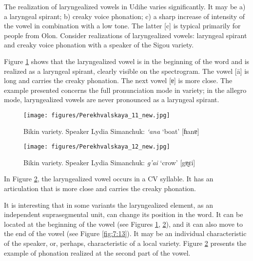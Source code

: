 \documentclass[output=paper,colorlinks,citecolor=brown]{langscibook}
\begin{document}
The realization of laryngealized vowels in  Udihe varies significantly. It may be a) a laryngeal spirant; b) creaky voice phonation; c) a sharp increase of intensity of the vowel in combination with a low tone. The latter [c] is typical primarily for people from Olon. Consider realizations of laryngealized vowels: laryngeal spirant and creaky voice phonation with a speaker of the Sigou variety.


Figure \ref{fig:7:11} shows that the laryngealized vowel is in the beginning of the word and is realized as a laryngeal spirant, clearly visible on the spectrogram. The vowel [ā] is long and carries the creaky phonation. The next vowel [{ɐ}] is more close. The example presented concerns the full pronunciation mode in  variety; in the allegro mode, laryngealized vowels are never pronounced as a laryngeal spirant.\largerpage


\begin{figure}
\texttt{[image: figures/Perekhvalskaya\_11\_new.jpg]}
\caption{Bikin variety. Speaker Lydia Simanchuk: \textit{‘ana} ‘boat’ [{ɦ}an{ɐ}]}
\label{fig:7:11}
\end{figure}

\begin{figure}
\texttt{[image: figures/Perekhvalskaya\_12\_new.jpg]}
\caption{Bikin variety. Speaker Lydia Simanchuk: \textit{g’ai} ‘crow’ [g{ɐ}{̰}{ɛ}i]}
\label{fig:7:12}
\end{figure}

In Figure \ref{fig:7:12}, the laryngealized vowel occurs in a CV syllable. It has an articulation that is more close and carries the creaky phonation.

It is interesting that in some  variants the laryngealized element, as an independent suprasegmental unit, can change its position in the word. It can be located at the beginning of the vowel (see Figures \ref{fig:7:11}, \ref{fig:7:12}), and it can also move to the end of the vowel (see Figure \ref{fig:7:13}). It may be an individual characteristic of the speaker, or, perhaps, characteristic of a local variety. Figure \ref{fig:7:12} presents the example of phonation realized at the second part of the vowel.
\end{document}
